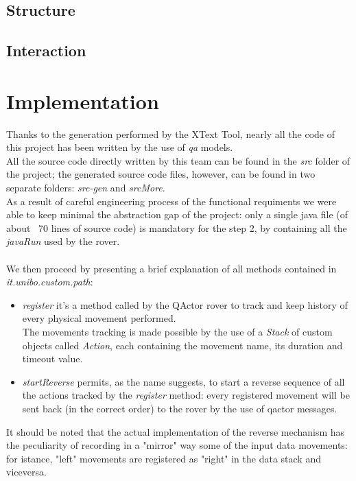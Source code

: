 \documentclass{llncs}
\newcommand{\labelsec}[1]{\label{sec:#1}}
\begin{document}

%
\newpage
\subsection{Structure}

\subsection{Interaction}
\newpage
\section{Implementation}
\labelsec{Implementation}
Thanks to the generation performed by the XText Tool, nearly all the code of this project has been written by the use of \textit{qa} models.\\
All the source code directly written by this team can be found in the \textit{src} folder of the project; the generated source code files, however, can be found in two separate folders: \textit{src-gen} and \textit{srcMore}.\\
As a result of careful engineering process of the functional requiments we were able to keep minimal the abstraction gap of the project: only a single java file (of about ~70 lines of source code) is mandatory for the step 2, by containing all the \textit{javaRun} used by the rover.\\\\
We then proceed by presenting a brief explanation of all methods contained in \textit{it.unibo.custom.path}:
\begin{itemize}
\item \textit{register} it's a method called by the QActor rover to track and keep history of every physical movement performed.\\
The movements tracking is made possible by the use of a \textit{Stack} of custom objects called \textit{Action}, each containing the movement name, its duration and timeout value.\\
\item \textit{startReverse} permits, as the name suggests, to start a reverse sequence of all the actions tracked by the \textit{register} method: every registered movement will be sent back (in the correct order) to the rover by the use of qactor messages.
\end{itemize}
It should be noted that the actual implementation of the reverse mechanism has the peculiarity of recording in a "mirror" way some of the input data movements: for istance, "left" movements are registered as "right" in the data stack and viceversa.
\newpage
\end{document}
